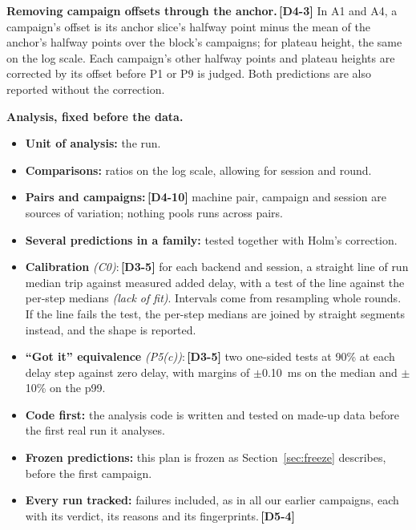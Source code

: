 \documentclass[11pt]{article}
\newcommand{\gl}[1]{{\color{soft}\itshape\small (#1)}}
\newcommand{\chgold}[1]{\,{\color{oldcol}\bfseries\footnotesize[#1]}}
\begin{document}
\textbf{Removing campaign offsets through the anchor.}\chgold{D4-3} In A1 and A4, a campaign's offset is its anchor slice's halfway point minus the mean of the anchor's halfway points over the block's campaigns; for plateau height, the same on the log scale. Each campaign's other halfway points and plateau heights are corrected by its offset before P1 or P9 is judged. Both predictions are also reported without the correction.

\textbf{Analysis, fixed before the data.}
\begin{itemize}
  \item \textbf{Unit of analysis:} the run.
  \item \textbf{Comparisons:} ratios on the log scale, allowing for session and round.
  \item \textbf{Pairs and campaigns:}\chgold{D4-10} machine pair, campaign and session are sources of variation; nothing pools runs across pairs.
  \item \textbf{Several predictions in a family:} tested together with Holm's correction.
  \item \textbf{Calibration} \gl{C0}:\chgold{D3-5} for each backend and session, a straight line of run median trip against measured added delay, with a test of the line against the per-step medians \gl{lack of fit}. Intervals come from resampling whole rounds. If the line fails the test, the per-step medians are joined by straight segments instead, and the shape is reported.
  \item \textbf{``Got it'' equivalence} \gl{P5(c)}:\chgold{D3-5} two one-sided tests at 90\% at each delay step against zero delay, with margins of $\pm$0.10~ms on the median and $\pm$10\% on the p99.
  \item \textbf{Code first:} the analysis code is written and tested on made-up data before the first real run it analyses.
  \item \textbf{Frozen predictions:} this plan is frozen as Section~\ref{sec:freeze} describes, before the first campaign.
  \item \textbf{Every run tracked:} failures included, as in all our earlier campaigns, each with its verdict, its reasons and its fingerprints.\chgold{D5-4}
\end{itemize}

\clearpage
\end{document}
